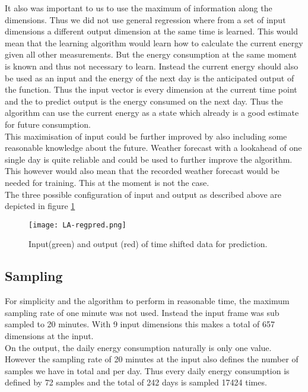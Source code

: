 \documentclass[conference]{IEEEtran}
\begin{document}
It also was important to us to use the maximum of information along the dimensions. Thus we did not use general regression where from a set of input dimensions a different output dimension at the same time is learned. This would mean that the learning algorithm would learn how to calculate the current energy given all other measurements. But the energy consumption at the same moment is known and thus not necessary to learn. Instead the current energy should also be used as an input and the energy of the next day is the anticipated output of the function. Thus the input vector is every dimension at the current time point and the to predict output is the energy consumed on the next day. Thus the algorithm can use the current energy as a state which already is a good estimate for future consumption.\\

This maximisation of input could be further improved by also including some reasonable knowledge about the future. Weather forecast with a lookahead of one single day is quite reliable and could be used to further improve the algorithm. This however would also mean that the recorded weather forecast would be needed for training. This at the moment is not the case.\\
The three possible configuration of input and output as described above are depicted in figure \ref{fig:timeshift}

\begin{figure}[!t] 
\centering 
\texttt{[image: LA-regpred.png]} 
\caption{Input(green) and output (red) of time shifted data for prediction.} 
\label{fig:timeshift} 
\end{figure}

\subsection{Sampling}
For simplicity and the algorithm to perform in reasonable time, the maximum sampling rate of one minute was not used. Instead the input frame was sub sampled to 20 minutes. With 9 input dimensions this makes a total of 657 dimensions at the input.\\
On the output, the daily energy consumption naturally is only one value. However the sampling rate of 20 minutes at the input also defines the number of samples we have in total and per day. Thus every daily energy consumption is defined by 72 samples and the total of 242 days is sampled 17424 times.
\end{document}
